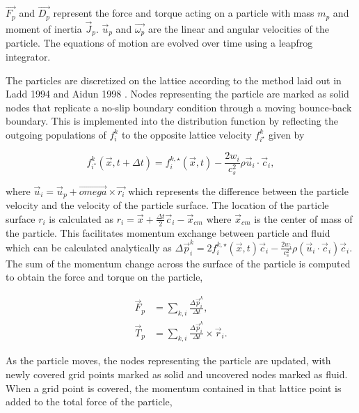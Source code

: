 $\vec{F_p}$ and $\vec{D_p}$ represent the force and torque acting on a particle with mass $m_p$ and moment of inertia 
$\vec{J}_p$. $\vec{u}_p$ and $\vec{\omega_{p}}$ are the linear and angular velocities of the particle. The equations of 
motion are evolved over time using a leapfrog integrator. \cite{jansen_bijels_2011}

The particles are discretized on the lattice according to the method laid out in Ladd 1994 and Aidun 1998
\cite{ladd_numerical_1994,aidun_direct_1998}. Nodes representing the particle are marked as solid nodes that replicate
a no-slip boundary condition through a moving bounce-back boundary. This is implemented into the distribution function
by reflecting the outgoing populations of $f_i^k$ to the opposite lattice velocity $f^k_{i^\star}$ given by

\begin{equation}
    f^k_{i^\star}(\vec{x}, t+\Delta t) = f^{k,\star}_i(\vec{x}, t) - \frac{2w_i}{c_s^2} \rho \vec{u}_i \cdot \vec{c}_i ,
\end{equation}

where $\vec{u}_i = \vec{u}_p + \vec{omega}\times \vec{r_i}$ which represents the difference between the particle velocity and the 
velocity of the particle surface. The location of the particle surface $r_i$ is calculated as $r_i = \vec{x} + \frac{\Delta t}{2}\vec{c}_i - \vec{x}_{cm}$ 
where $\vec{x}_{cm}$ is the center of mass of the particle.
This facilitates momentum exchange between particle and fluid which can be calculated analytically as 
\(\Delta\vec{p}^k_i = 2 f^{k,\star}_i(\vec{x},t)\vec{c}_i - \frac{2w_i}{c_s^2}\rho(\vec{u}_i\cdot\vec{c}_i)\vec{c}_i\).
The sum of the momentum change across the surface of the particle is computed to obtain the force and torque on the particle,

\begin{equation}
    \begin{split}
    \vec{F}_p &= \sum_{k,i} \frac{\Delta \vec{p}^k_i}{\Delta t} , \\
    \vec{T}_p &= \sum_{k,i} \frac{\Delta\vec{p}^k_i}{\Delta t} \times \vec{r}_i .
    \end{split}
\end{equation}

As the particle moves, the nodes representing the particle are updated, with newly covered grid points marked as solid and 
uncovered nodes marked as fluid. When a grid point is covered, the momentum contained in that lattice point is added to the 
total force of the particle,

